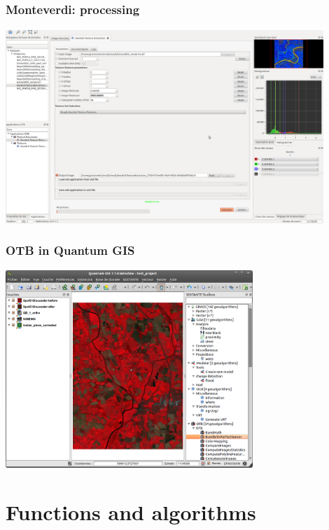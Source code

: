 \documentclass[8pt]{beamer}
\begin{document}
\begin{frame}
\frametitle{Monteverdi: processing}
\begin{minipage}[t][6cm][t]{\textwidth}
\begin{center}
\includegraphics[width=0.9\textwidth]{images/monteverdi2-haralick.png}
\end{center}
\end{minipage}
\end{frame}

\begin{frame}
\frametitle{OTB in Quantum GIS}
\begin{minipage}[t][6cm][t]{\textwidth}
\begin{center}
\includegraphics[width=0.7\textwidth]{images/otb_qgis.png}
\end{center}
\end{minipage}
\end{frame}

\section{Functions and algorithms}
\end{document}
